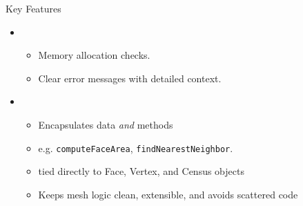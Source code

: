 \begin{frame}{Key Features}
    \begin{itemize}
        \item {} 
        \begin{itemize}
            \item Memory allocation checks.
            \item Clear error messages with detailed context.
        \end{itemize}
        \item {} 
        \begin{itemize}
		\item {} Encapsulates data \emph{and} methods
            	\item {} e.g. \texttt{computeFaceArea}, \texttt{findNearestNeighbor}.
        		\item {} tied directly to Face, Vertex, and Census objects
        		\item {} Keeps mesh logic clean, extensible, and avoids scattered code
    	\end{itemize}
    \end{itemize}
\end{frame}

%

